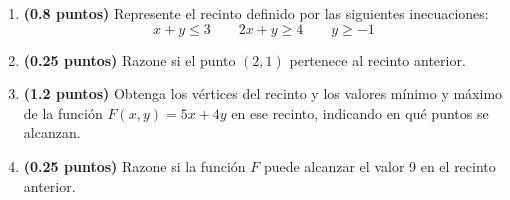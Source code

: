 
\begin{enumerate}[label=\alph*)]
\item \textbf{(0.8 puntos)} Represente el recinto definido por las siguientes inecuaciones:
\[
x+y\leq3\qquad2x+y\geq4\qquad y\geq-1
\]
\item \textbf{(0.25 puntos)} Razone si el punto $(2,1)$ pertenece al recinto anterior.
\item \textbf{(1.2 puntos)} Obtenga los vértices del recinto y los valores mínimo y máximo de la función $F(x,y)=5x+4y$ en ese recinto, indicando en qué puntos se alcanzan.
\item \textbf{(0.25 puntos)} Razone si la función $F$ puede alcanzar el valor 9 en el recinto anterior.
\end{enumerate}
